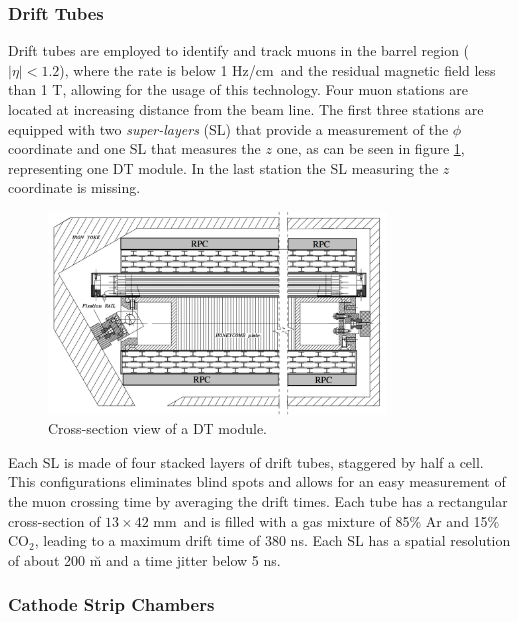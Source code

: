 \subsubsection*{Drift Tubes}

Drift tubes are employed to identify and track muons in the barrel region ($|\eta| < 1.2$), where the rate is below 1 Hz/cm\sq ~and the residual magnetic field less than 1 T, allowing for the usage of this technology. Four muon stations are located at increasing distance from the beam line. The first three stations are equipped with two \emph{super-layers} (SL) that provide a measurement of the $\phi$ coordinate and one SL that measures the $z$ one, as can be seen in figure \ref{fig:dt_module}, representing one DT module. In the last station the SL measuring the $z$ coordinate is missing. 

\begin{figure}
\begin{center}
\includegraphics[angle=-0,width=0.8\textwidth]{2_LHC_and_CMS/pics/cms_dt.png}
\caption{Cross-section view of a DT module.
\label{fig:dt_module}
}
\end{center}
\end{figure}


Each SL is made of four stacked layers of drift tubes, staggered by half a cell. This configurations eliminates blind spots and allows for an easy measurement of the muon crossing time by averaging the drift times. Each tube has a rectangular cross-section of $13\times42$ mm\sq ~and is filled with a gas mixture of 85\% Ar and 15\% CO$_2$, leading to a maximum drift time of 380 ns. Each SL has a spatial resolution of about 200 \u m and a time jitter below 5 ns.

\subsubsection*{Cathode Strip Chambers}

